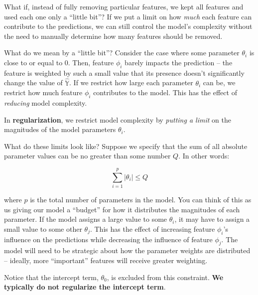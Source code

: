 \documentclass[
  letterpaper,
  DIV=11,
  numbers=noendperiod]{scrreprt}
\begin{document}
What if, instead of fully removing particular features, we kept all
features and used each one only a ``little bit''? If we put a limit on
how \emph{much} each feature can contribute to the predictions, we can
still control the model's complexity without the need to manually
determine how many features should be removed.

What do we mean by a ``little bit''? Consider the case where some
parameter \(\theta_i\) is close to or equal to 0. Then, feature
\(\phi_i\) barely impacts the prediction -- the feature is weighted by
such a small value that its presence doesn't significantly change the
value of \(\hat{\mathbb{Y}}\). If we restrict how large each parameter
\(\theta_i\) can be, we restrict how much feature \(\phi_i\) contributes
to the model. This has the effect of \emph{reducing} model complexity.

In \textbf{regularization}, we restrict model complexity by
\emph{putting a limit} on the magnitudes of the model parameters
\(\theta_i\).

What do these limits look like? Suppose we specify that the sum of all
absolute parameter values can be no greater than some number \(Q\). In
other words:

\[\sum_{i=1}^p |\theta_i| \leq Q\]

where \(p\) is the total number of parameters in the model. You can
think of this as us giving our model a ``budget'' for how it distributes
the magnitudes of each parameter. If the model assigns a large value to
some \(\theta_i\), it may have to assign a small value to some other
\(\theta_j\). This has the effect of increasing feature \(\phi_i\)'s
influence on the predictions while decreasing the influence of feature
\(\phi_j\). The model will need to be strategic about how the parameter
weights are distributed -- ideally, more ``important'' features will
receive greater weighting.

\begin{tcolorbox}[enhanced jigsaw, titlerule=0mm, bottomtitle=1mm, arc=.35mm, colframe=quarto-callout-note-color-frame, rightrule=.15mm, opacityback=0, opacitybacktitle=0.6, leftrule=.75mm, breakable, toprule=.15mm, colback=white, left=2mm, colbacktitle=quarto-callout-note-color!10!white, toptitle=1mm, bottomrule=.15mm, title=\textcolor{quarto-callout-note-color}{\faInfo}\hspace{0.5em}{Note}, coltitle=black]

Notice that the intercept term, \(\theta_0\), is excluded from this
constraint. \textbf{We typically do not regularize the intercept term}.

\end{tcolorbox}
\end{document}
